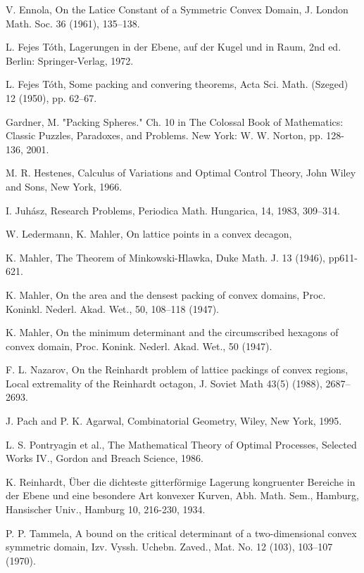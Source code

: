 \documentclass[11pt]{amsart}
\def\svninfo{{\tt
  filename: revision.tex\hfill\break
  PDF generated from LaTeX sources on \today; \hfill\break
  Repository Root: https://flyspeck.googlecode.com/svn \hfill\break
  SVN $LastChangedRevision$
  }
  }
\begin{document}
\begin{thebibliography}{}



  V. Ennola, On the Latice Constant of a Symmetric Convex
Domain, J. London Math. Soc. 36 (1961), 135--138.

 L. 
Fejes T\'oth,  Lagerungen in der Ebene, auf der Kugel und in Raum, 2nd ed. Berlin: Springer-Verlag, 1972.

 L. Fejes T\'oth, Some packing and convering theorems, Acta Sci. Math.
(Szeged) 12 (1950), pp. 62--67.

 Gardner, M. "Packing Spheres." Ch. 10 in The Colossal Book of Mathematics: Classic Puzzles, Paradoxes, and Problems. New York: W. W. Norton, pp. 128-136, 2001.

 M. R. Hestenes, Calculus of Variations and Optimal Control Theory, John Wiley and Sons, New York, 1966.

 I. Juh\'asz, Research Problems, Periodica Math. Hungarica,
14, 1983, 309--314. 

  W. Ledermann, K. Mahler, On lattice points in a convex
decagon,  %

  K. Mahler, The Theorem of Minkowski-Hlawka, Duke Math. J. 13 (1946), pp611-621.

  K. Mahler, On the area and the densest packing of convex domains,
Proc. Koninkl. Nederl. Akad. Wet., 50, 108--118 (1947).

 K. Mahler, On the minimum determinant and the circumscribed hexagons of convex domain, Proc. Konink. Nederl. Akad. Wet., 50 (1947).

  F. L. Nazarov, On the Reinhardt problem of lattice packings
of convex regions, Local extremality of the Reinhardt octagon,
J. Soviet Math 43(5) (1988), 2687--2693.


 J. Pach and P. K. Agarwal, Combinatorial Geometry, Wiley, New York, 1995.

 L. S. Pontryagin et al., The Mathematical Theory of Optimal Processes, Selected Works IV., Gordon and Breach Science, 1986.

 K. Reinhardt, \"Uber die dichteste gitterf\"ormige Lagerung
kongruenter Bereiche in der Ebene und eine besondere Art konvexer Kurven, Abh. Math. Sem., Hamburg, Hansischer Univ., Hamburg 10, 216-230, 1934.

 P. P. Tammela, A bound on the critical determinant of a two-dimensional convex symmetric domain,  Izv. Vyssh. Uchebn. Zaved., Mat. No. 12 (103), 103--107 (1970).




\end{thebibliography}

\end{document}
